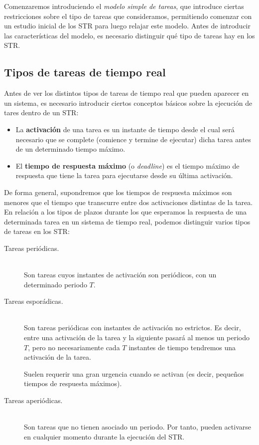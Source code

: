 Comenzaremos introduciendo el \textit{modelo simple de tareas}, que introduce ciertas restricciones sobre el tipo de tareas que consideramos, permitiendo comenzar con un estudio inicial de los STR para luego relajar este modelo. Antes de introducir las características del modelo, es necesario distinguir qué tipo de tareas hay en los STR\@.

\subsection{Tipos de tareas de tiempo real}
Antes de ver los distintos tipos de tareas de tiempo real que pueden aparecer en un sistema, es necesario introducir ciertos conceptos básicos sobre la ejecución de tares dentro de un STR\@:
\begin{itemize}
    \item La \textbf{activación} de una tarea es un instante de tiempo desde el cual será necesario que se complete (comience y termine de ejecutar) dicha tarea antes de un determinado tiempo máximo.
    \item El \textbf{tiempo de respuesta máximo} (o \emph{deadline}) es el tiempo máximo de respuesta que tiene la tarea para ejecutarse desde su última activación.
\end{itemize}
De forma general, supondremos que los tiempos de respuesta máximos son menores que el tiempo que transcurre entre dos activaciones distintas de la tarea.\\

En relación a los tipos de plazos durante los que esperamos la respuesta de una determinada tarea en un sistema de tiempo real, podemos distinguir varios tipos de tareas en los STR\@:
\begin{description}
    \item [Tareas periódicas.]~\\
        Son tareas cuyos instantes de activación son periódicos, con un determinado periodo $T$.
    \item [Tareas esporádicas.]~\\
        Son tareas periódicas con instantes de activación no estrictos. Es decir, entre una activación de la tarea y la siguiente pasará al menos un periodo $T$, pero no necesariamente cada $T$ instantes de tiempo tendremos una activación de la tarea.

        Suelen requerir una gran urgencia cuando se activan (es decir, pequeños tiempos de respuesta máximos).
        \item [Tareas aperiódicas.]~\\
            Son tareas que no tienen asociado un periodo. Por tanto, pueden activarse en cualquier momento durante la ejecución del STR\@.
\end{description}

